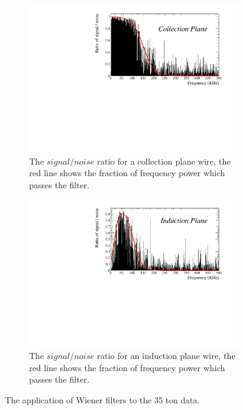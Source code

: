 \begin{figure}[h!]
\begin{subfigure}{0.45\textwidth}
    \centering
    \includegraphics[width=\textwidth]{Collection}
    \caption{The $signal/noise$ ratio for a collection plane wire, the red line shows the fraction of frequency power which passes the filter.}
    \label{fig:FreqCollection}
  \end{subfigure}
  \hspace{0.08\textwidth}
  \begin{subfigure}{0.45\textwidth}
    \centering
    \includegraphics[width=\textwidth]{Induction}
    \caption{The $signal/noise$ ratio for an induction plane wire, the red line shows the fraction of frequency power which passes the filter.}
    \label{fig:FreqInduction}
  \end{subfigure}
  \caption[Applying Wiener filters to the 35 ton data]
          {The application of Wiener filters to the 35 ton data.}
  \label{fig:FrequencyFilter}
\end{figure}

